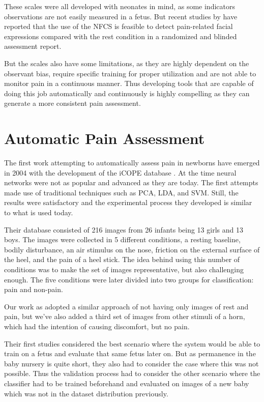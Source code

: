These scales were all developed with neonates in mind, as some indicators observations are not easily measured in a fetus. But recent studies by \citeauthor{bernardes2018feasibility} have reported that the use of the NFCS is feasible to detect pain-related facial expressions compared with the rest condition in a randomized and blinded assessment report.

But the scales also have some limitations, as they are highly dependent on the observant bias, require specific training for proper utilization and are not able to monitor pain in a continuous manner. Thus developing tools that are capable of doing this job automatically and continuously is highly compelling as they can generate a more consistent pain assessment.

\section{Automatic Pain Assessment}

The first work attempting to automatically assess pain in newborns have emerged in 2004 with the development of the iCOPE database \citep{Brahnam2006}. At the time neural networks were not as popular and advanced as they are today. The first attempts made use of traditional techniques such as PCA, LDA, and SVM. Still, the results were satisfactory and the experimental process they developed is similar to what is used today. 

Their database consisted of 216 images from 26 infants being 13 girls and 13 boys. The images were collected in 5 different conditions, a resting baseline, bodily disturbance, an air stimulus on the nose, friction on the external surface of the heel, and the pain of a heel stick. The idea behind using this number of conditions was to make the set of images representative, but also challenging enough. The five conditions were later divided into two groups for classification: pain and non-pain.

Our work as adopted a similar approach of not having only images of rest and pain, but we've also added a third set of images from other stimuli of a horn, which had the intention of causing discomfort, but no pain. 

Their first studies considered the best scenario where the system would be able to train on a fetus and evaluate that same fetus later on. But as permanence in the baby nursery is quite short, they also had to consider the case where this was not possible. Thus the validation process had to consider the other scenario where the classifier had to be trained beforehand and evaluated on images of a new baby which was not in the dataset distribution previously.

